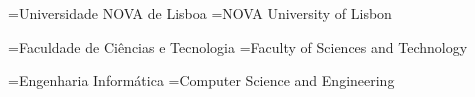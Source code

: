 \university[pt]={Universidade NOVA de Lisboa}
\university[en]={NOVA University of Lisbon}

\faculty[pt]={Faculdade de Ciências e Tecnologia}
\faculty[en]={Faculty of Sciences and Technology}

\majorfield[pt]={Engenharia Informática}
\majorfield[en]={Computer Science and Engineering}


